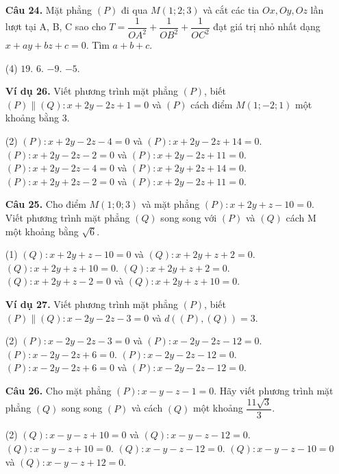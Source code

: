 \documentclass[12pt, a4paper]{article}
\begin{document}
\begin{enumerate}[label=\textbf{\arabic*.}, wide=0pt, leftmargin=*]
    \item[\textbf{Câu 24.}] Mặt phẳng \((P)\) đi qua \(M(1;2;3)\) và cắt các tia \(Ox, Oy, Oz\) lần lượt tại A, B, C sao cho \(T = \dfrac{1}{OA^2} + \dfrac{1}{OB^2} + \dfrac{1}{OC^2}\) đạt giá trị nhỏ nhất dạng \(x+ay+bz+c=0\). Tìm \(a+b+c\).
    \begin{tasks}(4)
        \task \(19\).
        \task \(6\).
        \task \(-9\).
        \task \(-5\).
    \end{tasks}
    
    \item[\textbf{Ví dụ 26.}] Viết phương trình mặt phẳng \((P)\), biết \((P) \parallel (Q): x+2y-2z+1=0\) và \((P)\) cách điểm \(M(1;-2;1)\) một khoảng bằng 3.
    \begin{tasks}(2)
        \task \((P): x+2y-2z-4=0\) và \((P): x+2y-2z+14=0\).
        \task \((P): x+2y-2z-2=0\) và \((P): x+2y-2z+11=0\).
        \task \((P): x+2y-2z-4=0\) và \((P): x+2y+2z+14=0\).
        \task \((P): x+2y+2z-2=0\) và \((P): x+2y-2z+11=0\).
    \end{tasks}
    

    \item[\textbf{Câu 25.}] Cho điểm \(M(1;0;3)\) và mặt phẳng \((P) : x+2y+z-10=0\). Viết phương trình mặt phẳng \((Q)\) song song với \((P)\) và \((Q)\) cách M một khoảng bằng \(\sqrt{6}\).
    \begin{tasks}[label-width=1.5em](1)
        \task \((Q): x+2y+z-10=0\) và \((Q): x+2y+z+2=0\).
        \task \((Q): x+2y+z+10=0\).
        \task \((Q): x+2y+z+2=0\).
        \task \((Q): x+2y+z-2=0\) và \((Q): x+2y+z+10=0\).
    \end{tasks}
    
    \item[\textbf{Ví dụ 27.}] Viết phương trình mặt phẳng \((P)\), biết \((P)\parallel(Q) : x-2y-2z-3=0\) và \(d((P),(Q))=3\).
    \begin{tasks}(2)
        \task \((P): x-2y-2z-3=0\) và \((P): x-2y-2z-12=0\).
        \task \((P): x-2y-2z+6=0\).
        \task \((P): x-2y-2z-12=0\).
        \task \((P): x-2y-2z+6=0\) và \((P): x-2y-2z-12=0\).
    \end{tasks}
    
    \item[\textbf{Câu 26.}] Cho mặt phẳng \((P) : x-y-z-1=0\). Hãy viết phương trình mặt phẳng \((Q)\) song song \((P)\) và cách \((Q)\) một khoảng \(\dfrac{11\sqrt{3}}{3}\).
    \begin{tasks}(2)
        \task \((Q): x-y-z+10=0\) và \((Q): x-y-z-12=0\).
        \task \((Q): x-y-z+10=0\).
        \task \((Q): x-y-z-12=0\).
        \task \((Q): x-y-z-10=0\) và \((Q): x-y-z+12=0\).
    \end{tasks}


\end{enumerate}
\end{document}
